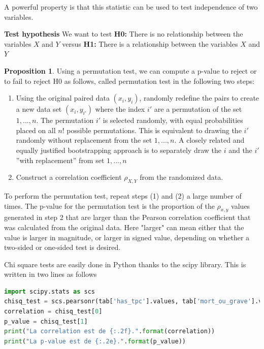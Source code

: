\documentclass[a4paper]{article}
\theoremstyle{definition}
\theoremstyle{proposition}
\newtheorem{proposition}{Proposition}[section]
\begin{document}
A powerful property is that this statistic can be used to test independence of two variables.\newline


\textbf{Test hypothesis} \newline
We want to test \textbf{H0:} There is no relationship between the variables $X$ and $Y$ versus \textbf{H1:} There is a relationship between the variables $X$ and $Y$



\begin{proposition}
Using a permutation test, we can compute a p-value to reject or to fail to reject H0 as follows, called permutation test in the following two steps: 

\begin{enumerate}
\item  Using the original paired data $(x_i,y_i)$, randomly redefine the pairs to create a new data set $(x_i,y_{i'})$ where the index $i'$ are a permutation of the set ${1,...,n}$.  
The permutation $i'$  is selected randomly, with equal probabilities placed on all $n!$ possible permutations.  
This is equivalent to drawing the $i'$ randomly without replacement from the set ${1, ..., n}$.  
A closely related and equally justified bootstrapping approach is to separately draw the $i$ and the $i'$  ''with replacement'' from  set ${1, ..., n}$
\item Construct a correlation coefficient $\rho_{X,Y}$ from the randomized data.
\end{enumerate}

To perform the permutation test, repeat steps (1) and (2) a large number of times.  The p-value for the permutation test is the proportion of the $\rho_{x,y}$ values generated in step 2 that are larger than the Pearson correlation coefficient that was calculated from the original data.  Here "larger" can mean either that the value is larger in magnitude, or larger in signed value, depending on whether a two-sided or one-sided test is desired.
\end{proposition}

Chi square tests are easily done in Python thanks to the scipy library. This is written in two lines as follows
\begin{lstlisting}[language=Python]
import scipy.stats as scs
chisq_test = scs.pearsonr(tab['has_tpc'].values, tab['mort_ou_grave'].values)
correlation = chisq_test[0]
p_value = chisq_test[1]
print("La correlation est de {:.2f}.".format(correlation))
print("La p-value est de {:.2e}.".format(p_value))
\end{lstlisting}
\end{document}
